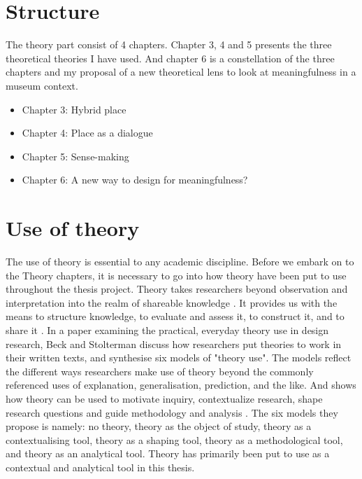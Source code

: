 \section*{Structure}

The theory part consist of 4 chapters. Chapter 3, 4 and 5 presents the three theoretical theories I have used. And chapter 6 is a constellation of the three chapters and my proposal of a new theoretical lens to look at meaningfulness in a museum context.
\begin{itemize}
    \item Chapter 3: Hybrid place
    \item Chapter 4: Place as a dialogue
    \item Chapter 5: Sense-making
    \item Chapter 6: A new way to design for meaningfulness?
\end{itemize}
\par


\section*{Use of theory}
The use of theory is essential to any academic discipline. Before we embark on to the Theory chapters, it is necessary to go into how theory have been put to use throughout the thesis project. Theory takes researchers beyond observation and interpretation into the realm of shareable knowledge \autocite[p. 126]{beck_examining_2016}. It provides us with the means to structure knowledge, to evaluate and assess it, to construct it, and to share it \autocite[p. 126]{beck_examining_2016}. In a paper examining the practical, everyday theory use in design research, Beck and Stolterman discuss how researchers put theories to work in their written texts, and synthesise six models of "theory use". The models reflect the different ways researchers make use of theory beyond the commonly referenced uses of explanation, generalisation, prediction, and the like. And shows how theory can be used to motivate inquiry, contextualize research, shape research questions and guide methodology and analysis \autocite[p. 134]{beck_examining_2016}. The six models they propose is namely: no theory, theory as the object of study, theory as a contextualising tool, theory as a shaping tool, theory as a methodological tool, and theory as an analytical tool. Theory has primarily been put to use as a contextual and analytical tool in this thesis. 

